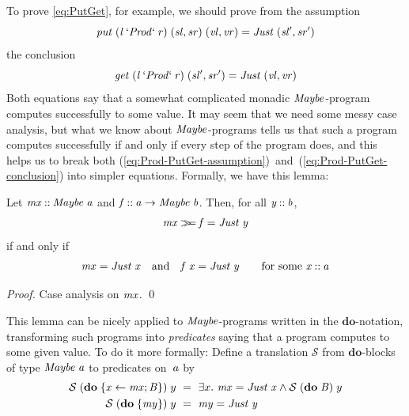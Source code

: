 To prove \ref{eq:PutGet}, for example, we should prove from the assumption
\begin{equation}
\mathit{put}\;(\mathit{l}\mathbin{`\mathit{Prod}`}\mathit{r})\;(\mathit{sl},\mathit{sr})\;(\mathit{vl},\mathit{vr})\mathrel{=}\mathit{Just}\;(\mathit{sl'},\mathit{sr'})
\label{eq:Prod-PutGet-assumption}
\end{equation}
the conclusion
\begin{equation}
\mathit{get}\;(\mathit{l}\mathbin{`\mathit{Prod}`}\mathit{r})\;(\mathit{sl'},\mathit{sr'})\mathrel{=}\mathit{Just}\;(\mathit{vl},\mathit{vr})
\label{eq:Prod-PutGet-conclusion}
\end{equation}
Both equations say that a somewhat complicated monadic \ensuremath{\Conid{Maybe}}-program computes successfully to some value.
It may seem that we need some messy case analysis, but what we know about \ensuremath{\Conid{Maybe}}-programs tells us that such a program computes successfully if and only if every step of the program does, and this helps us to break both (\ref{eq:Prod-PutGet-assumption})~and~(\ref{eq:Prod-PutGet-conclusion}) into simpler equations.
Formally, we have this lemma:
\begin{lemma}\label{lem:bind-success}
Let \ensuremath{\Varid{mx}\mathbin{::}\Conid{Maybe}\;\Varid{a}} and \ensuremath{\Varid{f}\mathbin{::}\Varid{a}\to \Conid{Maybe}\;\Varid{b}}. Then, for all \ensuremath{\Varid{y}\mathbin{::}\Varid{b}},
\[ \mathit{mx}\mathbin{>\!\!\!>\mkern-6.7mu=} \mathit{f}\mathrel{=}\mathit{Just}\;\mathit{y} \]
if and only if
\[ \mathit{mx}\mathrel{=}\mathit{Just}\;\mathit{x} \quad\text{and}\quad \mathit{f}\;\mathit{x}\mathrel{=}\mathit{Just}\;\mathit{y} \qquad\text{for some \ensuremath{\mathit{x}\mathbin{::}\mathit{a}}} \]
\end{lemma}
\begin{proof}
Case analysis on \ensuremath{\Varid{mx}}. \qed
\end{proof}
This lemma can be nicely applied to \ensuremath{\Conid{Maybe}}-programs written in the \ensuremath{\mathbf{do}}-notation, transforming such programs into \emph{predicates} saying that a program computes to some given value.
To do it more formally: Define a translation $\mathcal{S}$ from \ensuremath{\mathbf{do}}-blocks of type \ensuremath{\Conid{Maybe}\;\Varid{a}} to predicates on~\ensuremath{\Varid{a}} by
\begin{align*}
\mathcal S\;(\ensuremath{\mathbf{do}\;\{\Varid{x}\leftarrow \Varid{mx};\Conid{B}\}})\;y &~=~ \exists x.\ \ensuremath{\Varid{mx}\mathrel{=}\Conid{Just}\;\Varid{x}} \wedge \mathcal S\;(\ensuremath{\mathbf{do}\;\Conid{B}})\;y \\
\mathcal S\;(\ensuremath{\mathbf{do}\;\{\Varid{my}\}})\;y &~=~ \ensuremath{\Varid{my}\mathrel{=}\Conid{Just}\;\Varid{y}}
\end{align*}
